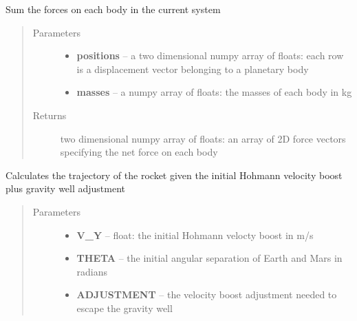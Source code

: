 \documentclass[letterpaper,10pt,english]{sphinxmanual}
\begin{document}
\begin{fulllineitems}
\label{index:orbital.calculate_forces}
Sum the forces on each body in the current system
\begin{quote}\begin{description}
\item[{Parameters}] \leavevmode\begin{itemize}
\item {} 
\textbf{positions} -- a two dimensional numpy array of floats: each row is a displacement vector belonging to a planetary body

\item {} 
\textbf{masses} -- a numpy array of floats: the masses of each body in kg

\end{itemize}

\item[{Returns}] \leavevmode
two dimensional numpy array of floats: an array of 2D force vectors specifying the net force on each body

\end{description}\end{quote}

\end{fulllineitems}


\begin{fulllineitems}
\label{index:orbital.calculate_trajectory}
Calculates the trajectory of the rocket given the initial
Hohmann velocity boost plus gravity well adjustment
\begin{quote}\begin{description}
\item[{Parameters}] \leavevmode\begin{itemize}
\item {} 
\textbf{V\_Y} -- float: the initial Hohmann velocty boost in m/s

\item {} 
\textbf{THETA} -- the initial angular separation of Earth and Mars in radians

\item {} 
\textbf{ADJUSTMENT} -- the velocity boost adjustment needed to escape the gravity well

\end{itemize}

\end{description}\end{quote}

\end{fulllineitems}
\end{document}
